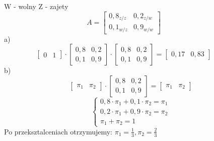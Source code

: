 \documentclass{article}
\begin{document}
\medskip 
{}  
\begin{flushleft}
W - wolny
Z - zajety
$$
A= \left[ 
        \begin{array}{cc}
         0,8_{z/z} & 0,2_{z/w}\\ 
         0,1_{w/z} & 0,9_{w/w}
         \end{array}
      \right] 
      \qquad$$
      a)\\$$
      \left[ 
        \begin{array}{cc}
         0 & 1
         \end{array}
      \right] \cdot
      \left[ 
        \begin{array}{cc}
         0,8 & 0,2\\ 
         0,1 & 0,9
         \end{array}
      \right] 
      \cdot
      \left[ 
        \begin{array}{cc}
         0,8 & 0,2\\ 
         0,1 & 0,9
         \end{array}
      \right] = \left[ 
        \begin{array}{cc}
         0,17 & 0,83
         \end{array}
      \right] 
      \qquad 
      $$
      b)\\
      $$
      \left[ 
        \begin{array}{cc}
         \pi_1 & \pi_2
         \end{array}
      \right] \cdot
      \left[ 
        \begin{array}{cc}
         0,8 & 0,2\\ 
         0,1 & 0,9
         \end{array}
      \right]  = \left[ 
        \begin{array}{cc}
         \pi_1 & \pi_2
         \end{array}
      \right]$$
\begin{equation}
    \left\{\begin{array}{rcl}
                     0,8\cdot\pi_1+ 0,1\cdot\pi_2 = \pi_1\\
                     0,2\cdot\pi_1+ 0,9\cdot\pi_2 = \pi_2\\
                     \pi_1+ \pi_2 = 1
\end{array}\right.
\end{equation}
Po przeksztalceniach otrzymujemy: $\pi_1 = \frac{1}{3}, \pi_2 = \frac{2}{3}$


\end{flushleft}
\end{document}

